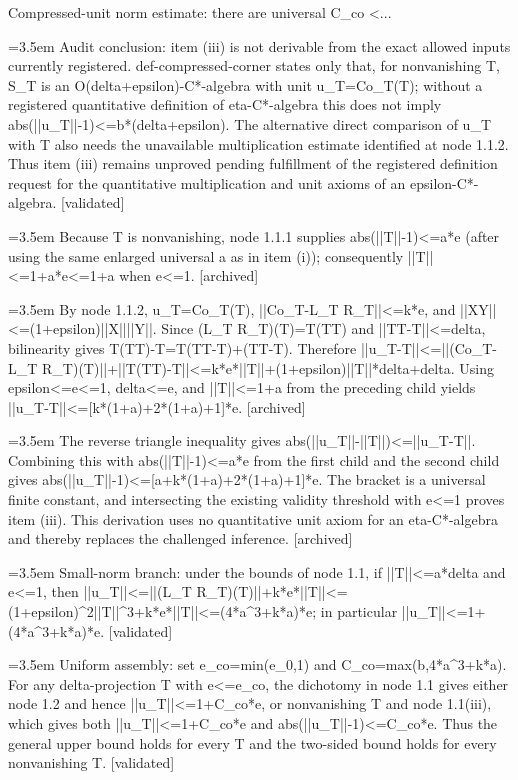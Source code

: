 \documentclass{article}
\newcommand{\step}[1]{\par\noindent\hangindent=3.5em\hangafter=1%
  \makebox[3.5em][l]{\textbf{#1.}}}
\newcommand{\steptag}[1]{\hfill{\small\textsf{[#1]}}}
\begin{document}
\begin{proofbox}{Compressed-unit norm estimate: there are universal C\_co <...}
\step{1.1.3} Audit conclusion: item (iii) is not derivable from the exact allowed inputs currently registered. def-compressed-corner states only that, for nonvanishing T, S\_T is an O(delta+epsilon)-C*-algebra with unit u\_T=Co\_T(T); without a registered quantitative definition of eta-C*-algebra this does not imply abs(||u\_T||-1)<=b*(delta+epsilon). The alternative direct comparison of u\_T with T also needs the unavailable multiplication estimate identified at node 1.1.2. Thus item (iii) remains unproved pending fulfillment of the registered definition request for the quantitative multiplication and unit axioms of an epsilon-C*-algebra. \steptag{validated} \\[6pt]
\step{1.1.3.1} Because T is nonvanishing, node 1.1.1 supplies abs(||T||-1)<=a*e (after using the same enlarged universal a as in item (i)); consequently ||T||<=1+a*e<=1+a when e<=1. \steptag{archived} \\[4pt]
\step{1.1.3.2} By node 1.1.2, u\_T=Co\_T(T), ||Co\_T-L\_T R\_T||<=k*e, and ||XY||<=(1+epsilon)||X||||Y||. Since (L\_T R\_T)(T)=T(TT) and ||TT-T||<=delta, bilinearity gives T(TT)-T=T(TT-T)+(TT-T). Therefore ||u\_T-T||<=||(Co\_T-L\_T R\_T)(T)||+||T(TT)-T||<=k*e*||T||+(1+epsilon)||T||*delta+delta. Using epsilon<=e<=1, delta<=e, and ||T||<=1+a from the preceding child yields ||u\_T-T||<=[k*(1+a)+2*(1+a)+1]*e. \steptag{archived} \\[4pt]
\step{1.1.3.3} The reverse triangle inequality gives abs(||u\_T||-||T||)<=||u\_T-T||. Combining this with abs(||T||-1)<=a*e from the first child and the second child gives abs(||u\_T||-1)<=[a+k*(1+a)+2*(1+a)+1]*e. The bracket is a universal finite constant, and intersecting the existing validity threshold with e<=1 proves item (iii). This derivation uses no quantitative unit axiom for an eta-C*-algebra and thereby replaces the challenged inference. \steptag{archived} \\[4pt]
\step{1.2} Small-norm branch: under the bounds of node 1.1, if ||T||<=a*delta and e<=1, then ||u\_T||<=||(L\_T R\_T)(T)||+k*e*||T||<=(1+epsilon)\textasciicircum{}2||T||\textasciicircum{}3+k*e*||T||<=(4*a\textasciicircum{}3+k*a)*e; in particular ||u\_T||<=1+(4*a\textasciicircum{}3+k*a)*e. \steptag{validated} \\[4pt]
\step{1.3} Uniform assembly: set e\_co=min(e\_0,1) and C\_co=max(b,4*a\textasciicircum{}3+k*a). For any delta-projection T with e<=e\_co, the dichotomy in node 1.1 gives either node 1.2 and hence ||u\_T||<=1+C\_co*e, or nonvanishing T and node 1.1(iii), which gives both ||u\_T||<=1+C\_co*e and abs(||u\_T||-1)<=C\_co*e. Thus the general upper bound holds for every T and the two-sided bound holds for every nonvanishing T. \steptag{validated} \\[4pt]

\end{proofbox}
\end{document}
